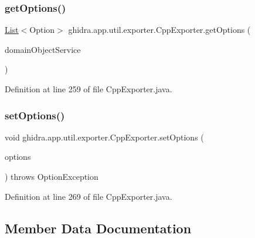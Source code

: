 \subsubsection{\texorpdfstring{getOptions()}{getOptions()}}
{\footnotesize\ttfamily \mbox{\hyperlink{xml_8hh_ab5ab62f46b3735557c125f91b40ac155}{List}}$<$Option$>$ ghidra.\+app.\+util.\+exporter.\+Cpp\+Exporter.\+get\+Options (\begin{DoxyParamCaption}\item[{Domain\+Object\+Service}]{domain\+Object\+Service }\end{DoxyParamCaption})\hspace{0.3cm}{\ttfamily [inline]}}



Definition at line 259 of file Cpp\+Exporter.\+java.

\mbox{\label{classghidra_1_1app_1_1util_1_1exporter_1_1_cpp_exporter_af27de4dbf4a23c38ad0f9a279d771306}} 
\subsubsection{\texorpdfstring{setOptions()}{setOptions()}}
{\footnotesize\ttfamily void ghidra.\+app.\+util.\+exporter.\+Cpp\+Exporter.\+set\+Options (\begin{DoxyParamCaption}\item[{\mbox{\hyperlink{xml_8hh_ab5ab62f46b3735557c125f91b40ac155}{List}}$<$ Option $>$}]{options }\end{DoxyParamCaption}) throws Option\+Exception\hspace{0.3cm}{\ttfamily [inline]}}



Definition at line 269 of file Cpp\+Exporter.\+java.



\subsection{Member Data Documentation}
\mbox{\label{classghidra_1_1app_1_1util_1_1exporter_1_1_cpp_exporter_a5387c584e3832434f2b526ab1fdadb11}} 
